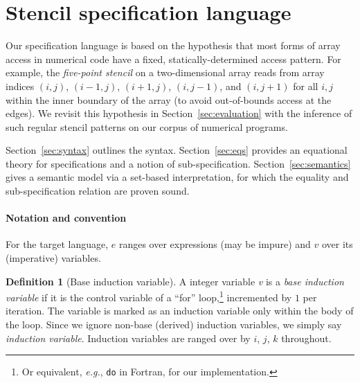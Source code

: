 \documentclass[9pt,preprint]{sigplanconf}
\newcounter{block}
\theoremstyle{definition}
\newtheorem{definition}[block]{Definition}
\newcommand{\eg}{\emph{e.g.}}
\begin{document}

\section{Stencil specification language}
\label{sec:lang}

Our specification language is based on the hypothesis
that most forms of array access in numerical code have
a fixed, statically-determined access pattern. For example, the
\emph{five-point stencil} on a two-dimensional array reads from array
indices $(i, j)$, $(i-1, j)$, $(i+1, j)$, $(i, j-1)$, and $(i, j+1)$
for all $i, j$ within the inner boundary of the array (to avoid
out-of-bounds access at the edges). We revisit this hypothesis
in Section~\ref{sec:evaluation} with the inference of
such regular stencil patterns on our corpus of numerical programs. 

Section~\ref{sec:syntax} outlines the syntax.
 Section~\ref{sec:eqs} provides an equational
theory for specifications and a notion of
sub-specification.  Section~\ref{sec:semantics}
gives a semantic model via a set-based interpretation, for which the
equality and sub-specification relation are proven sound.

\paragraph{Notation and convention}

\renewcommand*{\arraystretch}{0.8}
For the target language, $e$ ranges over expressions (may be impure) and $v$
over its (imperative) variables. %

\begin{definition}[Base induction variable]
  A integer variable \textit{v} is a \emph{base induction
    variable} if it is the control variable of a ``for''
  loop,\footnote{Or equivalent, \eg{}, \texttt{do} in Fortran, for our implementation.} incremented by $1$ per
iteration. The variable is marked as an induction variable
only within the body of the loop. Since we ignore non-base
(derived) induction variables, we simply say \emph{induction
  variable}. Induction variables are ranged over by $i$, $j$, $k$ throughout. 
\end{definition}
\end{document}
